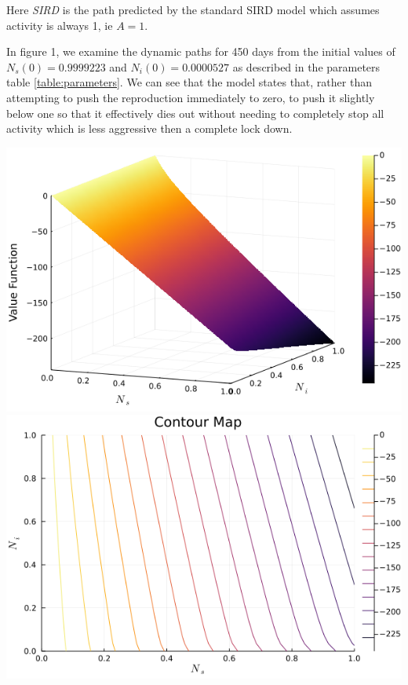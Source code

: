 \documentclass[12pt]{article}
\begin{document}
Here \emph{SIRD} is the path predicted by the standard SIRD model which assumes activity is always 1, ie $A=1$.

In figure 1, we examine the dynamic paths for 450 days from the initial values of $N_s(0) = 0.9999223$ and $N_i(0) = 0.0000527$ as described in the parameters table \ref{table:parameters}.
We can see that the model states that, rather than attempting to push the reproduction immediately to zero, to push it slightly below 
one so that it effectively dies out without needing to completely stop all activity which is less aggressive then a complete lock down.

\begin{center}
	\includegraphics[width = \textwidth]{../plots/valueFunction_Surface.png}
	\includegraphics[width = \textwidth]{../plots/valueFunction_Contour.png}
	\par\medskip
	\label{fig:figure2}
\end{center}
\end{document}
